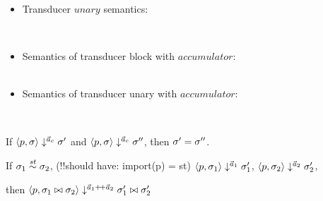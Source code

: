 \begin{itemize}
\\[2ex]

\\[2ex]


\item Transducer $unary$ semantics:\\ 


\PT{ \Axiom{\usum(\oF) \da \singl\unit}}
\PT{\Axiom{\usum(\oT) \da \emptyv }} \\[1ex]


\item Semantics of transducer block with $accumulator$: \\

\\[2ex]


\item Semantics of transducer unary with $accumulator$: \\


 \\




\end{itemize}


\begin{thm}[deterministic ??]
	\label{svcode-determ}
	If $\langle p,\sigma \rangle \downarrow^{\vec a_c} \sigma'$ and $\langle p,\sigma \rangle \downarrow^{\vec a_c} \sigma''$, 
	then $\sigma' = \sigma''$.
\end{thm}

\begin{lem}[??] \label{lem-sgm-join}
	If $\sigma_1 \stackrel{\mathit{st}}{\sim} \sigma_2$, (!!should have: import(p) = st)
	$\langle p,\sigma_1 \rangle \downarrow^{\vec a_1} \sigma_1'$, 
	$\langle p,\sigma_2 \rangle \downarrow^{\vec a_2} \sigma_2'$,
	
	then $\seval{p}{\sgm_1 \x{} \sgm_2}{\a_1 \++ \a_2}{\sgm_1' \x{} \sgm_2'}$
\end{lem}

